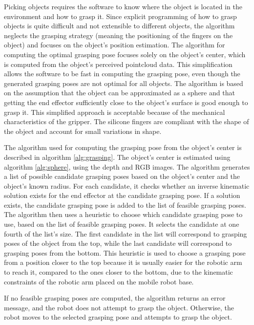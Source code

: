 Picking objects requires the software to know where the object is located in the environment and how to grasp it.
Since explicit programming of how to grasp objects is quite difficult and not extensible to different objects,
the algorithm neglects the grasping strategy (meaning the positioning of the fingers on the object)
and focuses on the object's position estimation. The algorithm for
computing the optimal grasping pose focuses solely on the object's center, which is computed from the object's
perceived pointcloud data. This simplification allows the software to be fast in computing the grasping pose,
even though the generated grasping poses are not optimal for all objects. The algorithm is based on the assumption
that the object can be approximated as a sphere and that getting the end effector sufficiently close to the
object's surface is good enough to grasp it.
This simplified approach is acceptable because of the mechanical characteristics of the gripper. 
The silicone fingers are compliant with the shape of the object and account for small variations in shape.

The algorithm used for computing the grasping pose from the object's center is described
in algorithm \ref{alg:grasping}. The object's center is estimated using algorithm \ref{alg:sphere},
using the depth and RGB images. The algorithm generates a list of possible candidate grasping poses
based on the object's center and the object's known radius. For each candidate, it checks whether 
an inverse kinematic solution exists for the end effector at the candidate grasping pose. 
If a solution exists, the candidate grasping pose is added to the list of feasible grasping poses.
The algorithm then uses a heuristic to choose which candidate grasping pose to use, based on the list
of feasible grasping poses. It selects the candidate at one fourth of the list's size. The first candidate in the 
list will correspond to grasping poses of the object from the top, while the last candidate will correspond
to grasping poses from the bottom. This heuristic is used to choose a grasping pose from a position closer to 
the top because it is usually easier for the robotic arm to reach it, compared to the ones closer to the bottom,
due to the kinematic constraints of the robotic arm placed on the mobile robot base.

If no feasible grasping poses are computed, the algorithm returns an error message, and the robot does not attempt
to grasp the object. Otherwise, the robot moves to the selected grasping pose and attempts to grasp the object.

